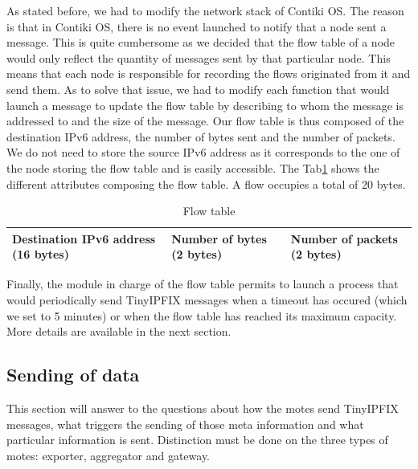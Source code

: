 As stated before, we had to modify the network stack of Contiki OS. The reason is that in Contiki OS, there is no event launched to notify that a node sent a message. This is quite cumbersome as we decided that the flow table of a node would only reflect the quantity of messages sent by that particular node. This means that each node is responsible for recording the flows originated from it and send them. As to solve that issue, we had to modify each function that would launch a message to update the flow table by describing to whom the message is addressed to and the size of the message. Our flow table is thus composed of the destination IPv6 address, the number of bytes sent and the number of packets. We do not need to store the source IPv6 address as it corresponds to the one of the node storing the flow table and is easily accessible. The Tab\ref{table:flow_table} shows the different attributes composing the flow table. A flow occupies a total of 20 bytes.\\

\begin{table}
  \centering
  \begin{tabular}{|p{4.5cm}|p{3cm}|p{3.5cm}|}
    \hline
    Destination IPv6 address \newline (16 bytes) & Number of bytes \newline (2 bytes) & Number of packets \newline (2 bytes)\\
    \hline
  \end{tabular}
  \caption{Flow table}
  \label{table:flow_table}
\end{table}

Finally, the module in charge of the flow table permits to launch a process that would periodically send TinyIPFIX messages when a timeout has occured (which we set to 5 minutes) or when the flow table has reached its maximum capacity. More details are available in the next section.

\subsection{Sending of data}

This section will answer to the questions about how the motes send TinyIPFIX messages, what triggers the sending of those meta information and what particular information is sent. Distinction must be done on the three types of motes: exporter, aggregator and gateway.\\

